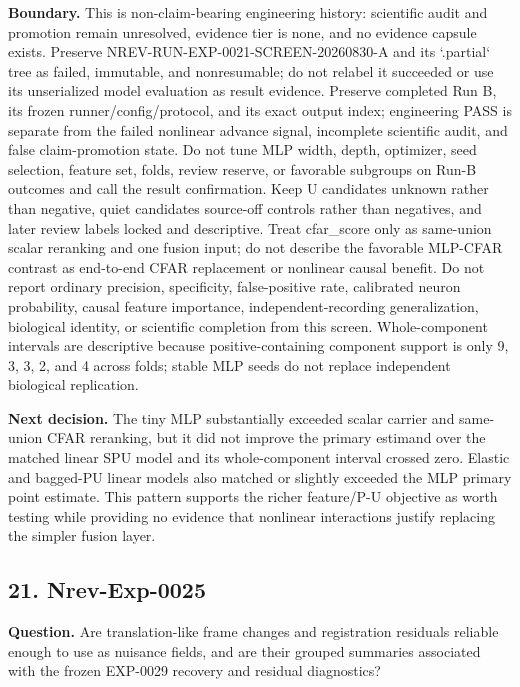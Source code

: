 \textbf{Boundary.} This is non-claim-bearing engineering history: scientific audit and promotion remain unresolved, evidence tier is none, and no evidence capsule exists. Preserve NREV-RUN-EXP-0021-SCREEN-20260830-A and its `.partial` tree as failed, immutable, and nonresumable; do not relabel it succeeded or use its unserialized model evaluation as result evidence. Preserve completed Run B, its frozen runner/config/protocol, and its exact output index; engineering PASS is separate from the failed nonlinear advance signal, incomplete scientific audit, and false claim-promotion state. Do not tune MLP width, depth, optimizer, seed selection, feature set, folds, review reserve, or favorable subgroups on Run-B outcomes and call the result confirmation. Keep U candidates unknown rather than negative, quiet candidates source-off controls rather than negatives, and later review labels locked and descriptive. Treat cfar\_score only as same-union scalar reranking and one fusion input; do not describe the favorable MLP-CFAR contrast as end-to-end CFAR replacement or nonlinear causal benefit. Do not report ordinary precision, specificity, false-positive rate, calibrated neuron probability, causal feature importance, independent-recording generalization, biological identity, or scientific completion from this screen. Whole-component intervals are descriptive because positive-containing component support is only 9, 3, 3, 2, and 4 across folds; stable MLP seeds do not replace independent biological replication.

\textbf{Next decision.} The tiny MLP substantially exceeded scalar carrier and same-union CFAR reranking, but it did not improve the primary estimand over the matched linear SPU model and its whole-component interval crossed zero. Elastic and bagged-PU linear models also matched or slightly exceeded the MLP primary point estimate. This pattern supports the richer feature/P-U objective as worth testing while providing no evidence that nonlinear interactions justify replacing the simpler fusion layer.

\subsection{21. Nrev-Exp-0025}

\textbf{Question.} Are translation-like frame changes and registration residuals reliable enough to use as nuisance fields, and are their grouped summaries associated with the frozen EXP-0029 recovery and residual diagnostics?

